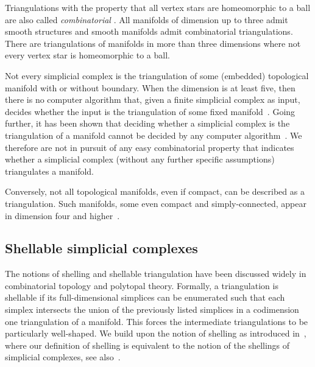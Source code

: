 \documentclass[10pt,a4paper]{article}
\begin{document}
\begin{remark}
    Triangulations with the property that all vertex stars are homeomorphic to a ball are also called \emph{combinatorial} \cite[Section~1]{Bagchi2005}.
    All manifolds of dimension up to three admit smooth structures and smooth manifolds admit combinatorial triangulations. 
    There are triangulations of manifolds in more than three dimensions where not every vertex star is homeomorphic to a ball. 
    
    Not every simplicial complex is the triangulation of some (embedded) topological manifold with or without boundary. 
    When the dimension is at least five, then there is no computer algorithm that, given a finite simplicial complex as input, decides whether the input is the triangulation of some fixed manifold~\cite{chernavsky2006unrecognizability}.
    Going further, it has been shown that deciding whether a simplicial complex is the triangulation of a manifold cannot be decided by any computer algorithm~\cite{poonen2014undecidable}.     
    We therefore are not in pursuit of any easy combinatorial property that indicates whether a simplicial complex (without any further specific assumptions) triangulates a manifold.

    Conversely, not all topological manifolds, even if compact, can be described as a triangulation. 
    Such manifolds, some even compact and simply-connected, appear in dimension four and higher~\cite{akbulut2014casson}.
\end{remark}








\subsection{Shellable simplicial complexes}\label{subsection:shellability}


The notions of shelling and shellable triangulation have been discussed widely in combinatorial topology and polytopal theory. 
Formally, a triangulation is shellable if its full-dimensional simplices can be enumerated such that each simplex intersects the union of the previously listed simplices in a codimension one triangulation of a manifold. 
This forces the intermediate triangulations to be particularly well-shaped. 
We build upon the notion of shelling as introduced in~\cite[Definition 8.1]{ziegler1995lectures},
where our definition of shelling is equivalent to the notion of the shellings of simplicial complexes, see also~\cite[Remark~8.3]{ziegler1995lectures}. 
\end{document}

